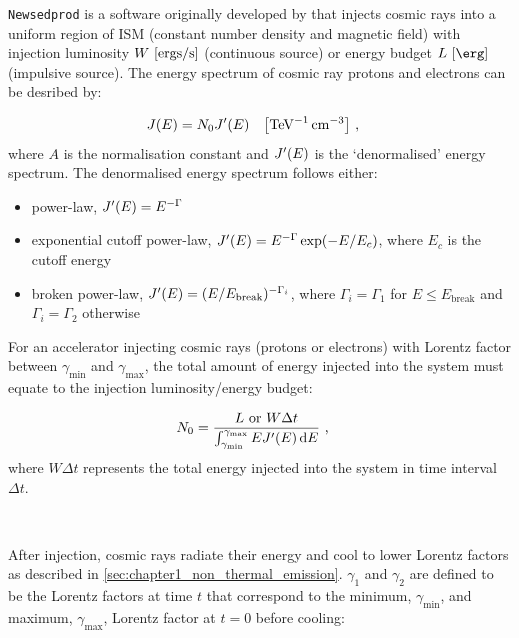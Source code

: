 {\tt Newsedprod} is a software originally developed by \citep{fabien} that injects cosmic rays into a uniform region of ISM (constant number density and magnetic field) with injection luminosity $W~\qty[\si{ergs\per\second}]$ (continuous source) or energy budget $L~\qty[\ergs]$  (impulsive source). The energy spectrum of cosmic ray protons and electrons can be desribed by:

\begin{equation}
    \begin{aligned}
  	  J\qty(E)&= N_0 J'\qty(E)\quad\qty[\si{\per\tera\electronvolt\per\centi\meter\cubed}]\text{ ,}
    \end{aligned}
\end{equation}
\noindent where $A$ is the normalisation constant and $J'\qty(E)$ is the `denormalised' energy spectrum. The denormalised energy spectrum follows either:

\begin{itemize}
    \itemsep0em 
    \item power-law, $J'\qty(E)=E^{-\Gamma}$
    \item exponential cutoff power-law, $J'\qty(E)=E^{-\Gamma}\exp(-E/E_c)$, where $E_c$ is the cutoff energy
    \item broken power-law, $J'\qty(E)=(E/E_\text{break})^{-\Gamma_i}$, where $\Gamma_i=\Gamma_1$ for $E\leq E_\text{break}$ and $\Gamma_i = \Gamma_2$ otherwise
\end{itemize}

\noindent For an accelerator injecting cosmic rays (protons or electrons) with Lorentz factor between $\gamma_\text{min}$ and $\gamma_\text{max}$, the total amount of energy injected into the system must equate to the injection luminosity/energy budget:

\begin{equation}
    \begin{aligned}
 	   N_0&=\frac{L\text{ or }W\Delta t}{\int_{\gamma_\text{min}}^{\gamma_\text{max}} EJ'\qty(E)\dd{E}}\text{ ,}
    \end{aligned} \label{eq:chapter_7_energy_budget}
\end{equation}
\noindent where $W\Delta t$ represents the total energy injected into the system in time interval $\Delta t$.
\par~\par
After injection, cosmic rays radiate their energy and cool to lower Lorentz factors as described in \autoref{sec:chapter1_non_thermal_emission}. $\gamma_1$ and $\gamma_2$ are defined to be the Lorentz factors at time $t$ that correspond to the minimum, $\gamma_\text{min}$, and maximum, $\gamma_\text{max}$, Lorentz factor at $t=0$ before cooling:

